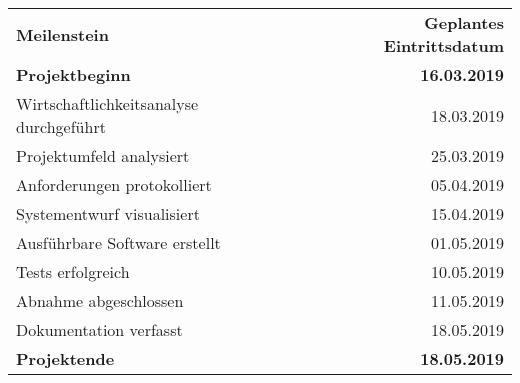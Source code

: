 \begin{tabular}{lr}
\rowcolor{KVGruen}\textbf{Meilenstein} & \textbf{Geplantes Eintrittsdatum} \\
\textbf{Projektbeginn} & \textbf{16.03.2019} \\
\rowcolor{KVGrau}Wirtschaftlichkeitsanalyse durchgeführt & 18.03.2019 \\
Projektumfeld analysiert & 25.03.2019 \\
\rowcolor{KVGrau}Anforderungen protokolliert & 05.04.2019 \\
Systementwurf visualisiert & 15.04.2019 \\
\rowcolor{KVGrau}Ausführbare Software erstellt & 01.05.2019 \\
Tests erfolgreich & 10.05.2019 \\
\rowcolor{KVGrau}Abnahme abgeschlossen & 11.05.2019 \\
Dokumentation verfasst & 18.05.2019 \\
\rowcolor{KVGrau}\textbf{Projektende} & \textbf{18.05.2019} \\
\end{tabular}
